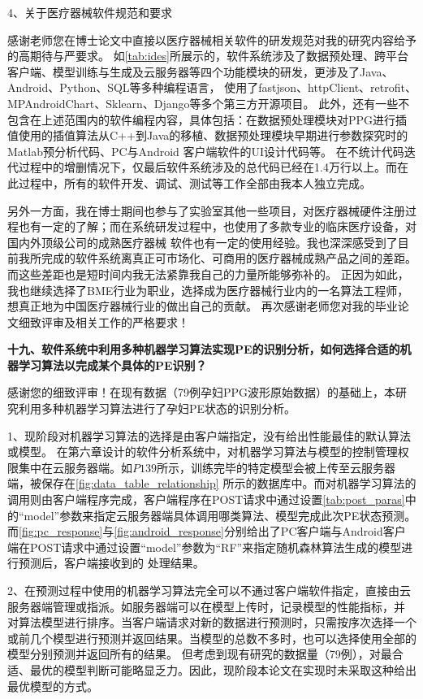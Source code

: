 4、关于医疗器械软件规范和要求

感谢老师您在博士论文中直接以医疗器械相关软件的研发规范对我的研究内容给予的高期待与严要求。
如\autoref{tab:ides}所展示的，软件系统涉及了数据预处理、跨平台客户端、模型训练与生成及云服务器等四个功能模块的研发，更涉及了Java、Android、Python、SQL等多种编程语言，
使用了fastjson、httpClient、retrofit、MPAndroidChart、Sklearn、Django等多个第三方开源项目。
此外，还有一些不包含在上述范围内的软件编程内容，具体包括：在数据预处理模块对PPG进行插值使用的插值算法从C++到Java的移植、数据预处理模块早期进行参数探究时的Matlab预分析代码、PC与Android
客户端软件的UI设计代码等。
在不统计代码迭代过程中的增删情况下，仅最后软件系统涉及的总代码已经在1.4万行以上。而在此过程中，所有的软件开发、调试、测试等工作全部由我本人独立完成。

另外一方面，我在博士期间也参与了实验室其他一些项目，对医疗器械硬件注册过程也有一定的了解；而在系统研发过程中，也使用了多款专业的临床医疗设备，对国内外顶级公司的成熟医疗器械
软件也有一定的使用经验。我也深深感受到了目前我所完成的软件系统离真正可市场化、可商用的医疗器械成熟产品之间的差距。而这些差距也是短时间内我无法紧靠我自己的力量所能够弥补的。
正因为如此，我也继续选择了BME行业为职业，选择成为医疗器械行业内的一名算法工程师，想真正地为中国医疗器械行业的做出自己的贡献。
再次感谢老师您对我的毕业论文细致评审及相关工作的严格要求！

\textbf{十九、软件系统中利用多种机器学习算法实现PE的识别分析，如何选择合适的机器学习算法以完成某个具体的PE识别？}

感谢您的细致评审！在现有数据（79例孕妇PPG波形原始数据）的基础上，本研究利用多种机器学习算法进行了孕妇PE状态的识别分析。

1、现阶段对机器学习算法的选择是由客户端指定，没有给出性能最佳的默认算法或模型。
在第六章设计的软件分析系统中，对机器学习算法与模型的控制管理权限集中在云服务器端。如$P139$所示，训练完毕的特定模型会被上传至云服务器端，被保存在\autoref{fig:data_table_relationship}
所示的数据库中。而对机器学习算法的调用则由客户端程序完成，客户端程序在POST请求中通过设置\autoref{tab:post_paras}中的“model”参数来指定云服务器端具体调用哪类算法、模型完成此次PE状态预测。
而\autoref{fig:pc_response}与\autoref{fig:android_response}分别给出了PC客户端与Android客户端在POST请求中通过设置“model”参数为“RF”来指定随机森林算法生成的模型进行预测后，客户端接收到的
处理结果。

2、在预测过程中使用的机器学习算法完全可以不通过客户端软件指定，直接由云服务器端管理或指派。如服务器端可以在模型上传时，记录模型的性能指标，并
对算法模型进行排序。当客户端请求对新的数据进行预测时，只需按序次选择一个或前几个模型进行预测并返回结果。当模型的总数不多时，也可以选择使用全部的模型分别预测并返回所有的结果。
但考虑到现有研究的数据量（79例），对最合适、最优的模型判断可能略显乏力。因此，现阶段本论文在实现时未采取这种给出最优模型的方式。

